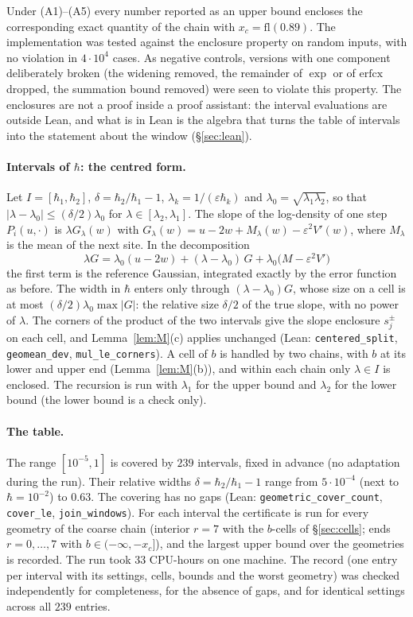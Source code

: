 \documentclass[11pt,a4paper]{article}
\theoremstyle{definition}
\theoremstyle{remark}
\newcommand{\xc}{x_c}
\newcommand{\code}[1]{\texttt{#1}}
\begin{document}
Under (A1)--(A5) every number reported as an upper bound encloses the corresponding exact quantity of the chain with $\xc=\mathrm{fl}(0.89)$. The implementation was tested against the enclosure property on random inputs, with no violation in $4\cdot10^4$ cases. As negative controls, versions with one component deliberately broken (the widening removed, the remainder of $\exp$ or of $\mathrm{erfcx}$ dropped, the summation bound removed) were seen to violate this property. The enclosures are not a proof inside a proof assistant: the interval evaluations are outside Lean, and what is in Lean is the algebra that turns the table of intervals into the statement about the window (\S\ref{sec:lean}).

\paragraph{Intervals of $\hbar$: the centred form.} Let $I=[\hbar_1,\hbar_2]$, $\delta=\hbar_2/\hbar_1-1$, $\lambda_k=1/(\varepsilon\hbar_k)$ and $\lambda_0=\sqrt{\lambda_1\lambda_2}$, so that $|\lambda-\lambda_0|\le(\delta/2)\lambda_0$ for $\lambda\in[\lambda_2,\lambda_1]$. The slope of the log-density of one step $P_i(u,\cdot)$ is $\lambda G_\lambda(w)$ with $G_\lambda(w)=u-2w+M_\lambda(w)-\varepsilon^2V'(w)$, where $M_\lambda$ is the mean of the next site. In the decomposition
\[
\lambda G=\lambda_0(u-2w)+(\lambda-\lambda_0)\,G+\lambda_0\big(M-\varepsilon^2V'\big)
\]
the first term is the reference Gaussian, integrated exactly by the error function as before. The width in $\hbar$ enters only through $(\lambda-\lambda_0)G$, whose size on a cell is at most $(\delta/2)\lambda_0\max|G|$: the relative size $\delta/2$ of the true slope, with no power of $\lambda$. The corners of the product of the two intervals give the slope enclosure $s_j^\pm$ on each cell, and Lemma~\ref{lem:M}(c) applies unchanged (Lean: \code{centered\_split}, \code{geomean\_dev}, \code{mul\_le\_corners}). A cell of $b$ is handled by two chains, with $b$ at its lower and upper end (Lemma~\ref{lem:M}(b)), and within each chain only $\lambda\in I$ is enclosed. The recursion is run with $\lambda_1$ for the upper bound and $\lambda_2$ for the lower bound (the lower bound is a check only).

\paragraph{The table.} The range $[10^{-5},1]$ is covered by $239$ intervals, fixed in advance (no adaptation during the run). Their relative widths $\delta=\hbar_2/\hbar_1-1$ range from $5\cdot10^{-4}$ (next to $\hbar=10^{-2}$) to $0.63$. The covering has no gaps (Lean: \code{geometric\_cover\_count}, \code{cover\_le}, \code{join\_windows}). For each interval the certificate is run for every geometry of the coarse chain (interior $r=7$ with the $b$-cells of \S\ref{sec:cells}; ends $r=0,\dots,7$ with $b\in(-\infty,-\xc]$), and the largest upper bound over the geometries is recorded. The run took $33$ CPU-hours on one machine. The record (one entry per interval with its settings, cells, bounds and the worst geometry) was checked independently for completeness, for the absence of gaps, and for identical settings across all $239$ entries.
\end{document}
